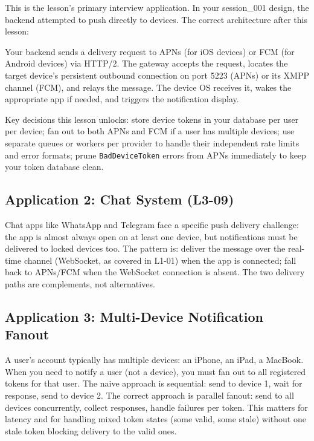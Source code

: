 \documentclass[11pt,a4paper]{article}
\begin{document}
This is the lesson's primary interview application. In your session\_001 design, the backend attempted to push directly to devices. The correct architecture after this lesson:

Your backend sends a delivery request to APNs (for iOS devices) or FCM (for Android devices) via HTTP/2. The gateway accepts the request, locates the target device's persistent outbound connection on port 5223 (APNs) or its XMPP channel (FCM), and relays the message. The device OS receives it, wakes the appropriate app if needed, and triggers the notification display.

Key decisions this lesson unlocks: store device tokens in your database per user per device; fan out to both APNs and FCM if a user has multiple devices; use separate queues or workers per provider to handle their independent rate limits and error formats; prune \texttt{BadDeviceToken} errors from APNs immediately to keep your token database clean.

\subsection{Application 2: Chat System (L3-09)}

Chat apps like WhatsApp and Telegram face a specific push delivery challenge: the app is almost always open on at least one device, but notifications must be delivered to locked devices too. The pattern is: deliver the message over the real-time channel (WebSocket, as covered in L1-01) when the app is connected; fall back to APNs/FCM when the WebSocket connection is absent. The two delivery paths are complements, not alternatives.

\subsection{Application 3: Multi-Device Notification Fanout}

A user's account typically has multiple devices: an iPhone, an iPad, a MacBook. When you need to notify a user (not a device), you must fan out to all registered tokens for that user. The naive approach is sequential: send to device 1, wait for response, send to device 2. The correct approach is parallel fanout: send to all devices concurrently, collect responses, handle failures per token. This matters for latency and for handling mixed token states (some valid, some stale) without one stale token blocking delivery to the valid ones.

\end{document}
